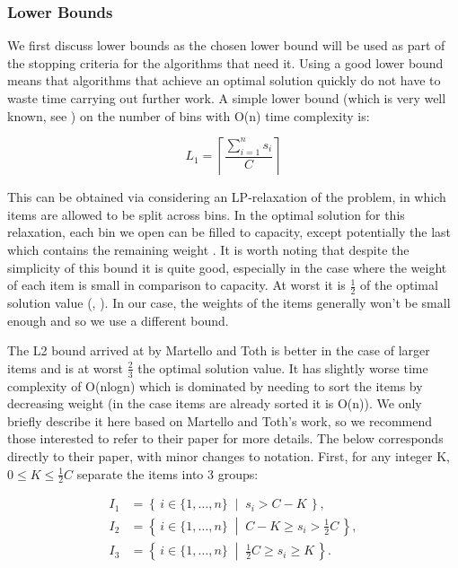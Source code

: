 \documentclass[12pt]{article}
\begin{document}
\subsubsection{Lower Bounds}

We first discuss lower bounds as the chosen lower bound will be used as part of the stopping criteria for the algorithms that need it. Using a good lower bound means that algorithms that achieve an optimal solution quickly do not have to waste time carrying out further work. A simple lower bound (which is very well known, see \cite{martello} \cite{gfgbound}) on the number of bins with O(n) time complexity is: 

\[
L_1 = \left\lceil \frac{\sum_{i=1}^{n} s_i}{C} \right\rceil
\]

This can be obtained via considering an LP-relaxation of the problem, in which items are allowed to be split across bins. In the optimal solution for this relaxation, each bin we open can be filled to capacity, except potentially the last which contains the remaining weight \cite{fekete}. It is worth noting that despite the simplicity of this bound it is quite good, especially in the case where the weight of each item is small in comparison to capacity. At worst it is $\frac{1}{2}$ of the optimal solution value (\cite{martello}, \cite{fekete}). In our case, the weights of the items generally won’t be small enough and so we use a different bound. 

The L2 bound arrived at by Martello and Toth \cite{martello} is better in the case of larger items and is at worst $\frac{2}{3}$ the optimal solution value. It has slightly worse time complexity of O(nlogn) which is dominated by needing to sort the items by decreasing weight (in the case items are already sorted it is O(n)). We only briefly describe it here based on Martello and Toth’s work, so we recommend those interested to refer to their paper \cite{martello} for more details. The below corresponds directly to their paper, with minor changes to notation. First, for any integer K, $0 \le K \le \frac{1}{2} C$ separate the items into 3 groups: 

\[
\begin{aligned}
I_1 &= \left\{\, i \in \{1,\dots,n\} \;\middle|\; s_i > C - K \,\right\},\\
I_2 &= \left\{\, i \in \{1,\dots,n\} \;\middle|\; C - K \ge s_i > \tfrac{1}{2}C \,\right\},\\
I_3 &= \left\{\, i \in \{1,\dots,n\} \;\middle|\; \tfrac{1}{2}C \ge s_i \ge K \,\right\}.
\end{aligned}
\]
\end{document}
